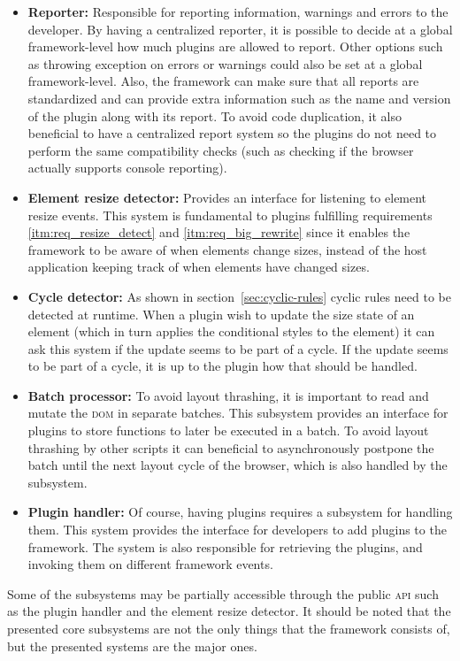 \documentclass[a4paper,11pt]{kth-mag}
\begin{document}
        \begin{itemize}
          \item \textbf{Reporter:}
            Responsible for reporting information, warnings and errors to the developer.
            By having a centralized reporter, it is possible to decide at a global framework-level how much plugins are allowed to report.
            Other options such as throwing exception on errors or warnings could also be set at a global framework-level.
            Also, the framework can make sure that all reports are standardized and can provide extra information such as the name and version of the plugin along with its report.
            To avoid code duplication, it also beneficial to have a centralized report system so the plugins do not need to perform the same compatibility checks (such as checking if the browser actually supports console reporting).
          \item \textbf{Element resize detector:}
            Provides an interface for listening to element resize events.
            This system is fundamental to plugins fulfilling requirements \ref{itm:req_resize_detect} and \ref{itm:req_big_rewrite} since it enables the framework to be aware of when elements change sizes, instead of the host application keeping track of when elements have changed sizes.
          \item \textbf{Cycle detector:}
            As shown in section~\ref{sec:cyclic-rules} cyclic rules need to be detected at runtime.
            When a plugin wish to update the size state of an element (which in turn applies the conditional styles to the element) it can ask this system if the update seems to be part of a cycle.
            If the update seems to be part of a cycle, it is up to the plugin how that should be handled.
          \item \textbf{Batch processor:}
            To avoid layout thrashing, it is important to read and mutate the \textsc{dom} in separate batches.
            This subsystem provides an interface for plugins to store functions to later be executed in a batch.
            To avoid layout thrashing by other scripts it can beneficial to asynchronously postpone the batch until the next layout cycle of the browser, which is also handled by the subsystem.
          \item \textbf{Plugin handler:}
            Of course, having plugins requires a subsystem for handling them.
            This system provides the interface for developers to add plugins to the framework.
            The system is also responsible for retrieving the plugins, and invoking them on different framework events.
        \end{itemize}
        Some of the subsystems may be partially accessible through the public \textsc{api} such as the plugin handler and the element resize detector.
        It should be noted that the presented core subsystems are not the only things that the framework consists of, but the presented systems are the major ones.
\end{document}
